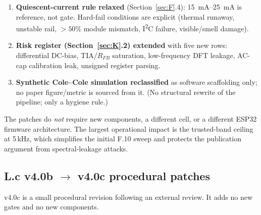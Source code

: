\documentclass[11pt,a4paper]{article}
\begin{document}
\begin{enumerate}[leftmargin=1.5em]
\item \textbf{Quiescent-current rule relaxed} (Section~\ref{sec:F}.4): \SIrange{15}{25}{\milli\ampere} is reference, not gate. Hard-fail conditions are explicit (thermal runaway, unstable rail, $>\!50\%$ module mismatch, I\textsuperscript{2}C failure, visible/smell damage).
\item \textbf{Risk register (Section~\ref{sec:K}.2) extended} with five new rows: differential DC-bias, TIA/$R_{FB}$ saturation, low-frequency DFT leakage, AC-cap calibration leak, unsigned register parsing.
\item \textbf{Synthetic Cole--Cole simulation reclassified} as software scaffolding only; no paper figure/metric is sourced from it. (No structural rewrite of the pipeline; only a hygiene rule.)
\end{enumerate}

The patches do \emph{not} require new components, a different cell, or a different ESP32 firmware architecture. The largest operational impact is the trusted-band ceiling at 5\,kHz, which simplifies the initial F.10 sweep and protects the publication argument from spectral-leakage attacks.

\subsection*{L.c v4.0b $\rightarrow$ v4.0c procedural patches}

v4.0c is a small procedural revision following an external review. It adds no new gates and no new components.
\end{document}
